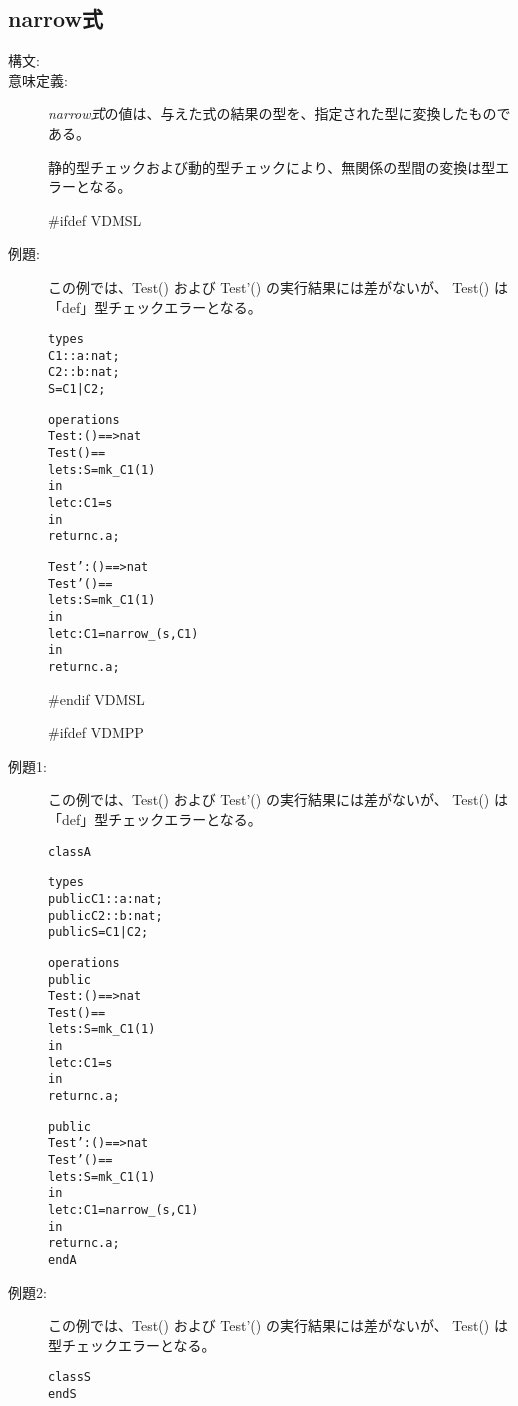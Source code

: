 \documentclass[\pformat,12pt]{jarticle}
\begin{document}
\subsection{narrow式}
\label{narrow}

\begin{description}
\item[構文:] 

\item[意味定義:] {\it narrow式}の値は、与えた式の結果の型を、指定された型に変換したものである。

静的型チェックおよび動的型チェックにより、無関係の型間の変換は型エラーとなる。

#ifdef VDMSL
\item[例題:]
この例では、Test() および Test'() の実行結果には差がないが、
Test() は「def」型チェックエラーとなる。

\begin{alltt}
types
C1 :: a : nat;
C2 :: b : nat;
S = C1 | C2;

operations
Test: () ==> nat
Test() ==
 let s : S = mk_C1(1)
 in
   let c : C1 = s
   in
     return c.a;

Test': () ==> nat
Test'() ==
 let s : S = mk_C1(1)
 in
   let c : C1 = narrow_(s, C1)
   in
     return c.a;
\end{alltt}
#endif VDMSL

#ifdef VDMPP
\item[例題1:]
この例では、Test() および Test'() の実行結果には差がないが、
Test() は「def」型チェックエラーとなる。

\begin{alltt}
class A

types
public C1 :: a : nat;
public C2 :: b : nat;
public S = C1 | C2;

operations
public
Test: () ==> nat
Test() ==
 let s : S = mk_C1(1)
 in
   let c : C1 = s
   in
     return c.a;

public
Test': () ==> nat
Test'() ==
 let s : S = mk_C1(1)
 in
   let c : C1 = narrow_(s, C1)
   in
     return c.a;
end A
\end{alltt}

\item[例題2:]
この例では、Test() および Test'() の実行結果には差がないが、
Test() は型チェックエラーとなる。

\begin{alltt}
class S
end S


\end{alltt}
\end{description}
\end{document}
